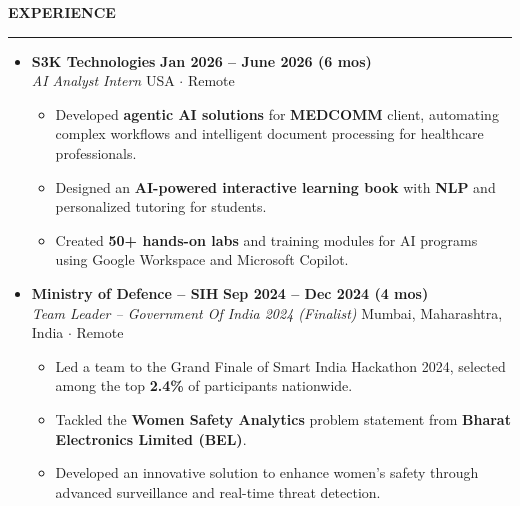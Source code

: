 \documentclass[letterpaper,10pt]{article}
\newcommand{\sectionheader}[1]{%
    \vspace{3pt}
    \noindent\textbf{\large #1}
    \rule{\linewidth}{0.4pt}
    \vspace{-2pt}
}
\begin{document}
\sectionheader{EXPERIENCE}
\begin{itemize}[leftmargin=*,label=\textbullet, noitemsep, topsep=0pt, partopsep=0pt]
    \item \textbf{S3K Technologies} \hfill \textbf{Jan 2026 – June 2026 (6 mos)} \\
    \textit{AI Analyst Intern} \hfill USA $\cdot$ Remote
    \begin{itemize}[leftmargin=0.75cm,label=\textbullet, noitemsep, topsep=0pt, partopsep=0pt]
        \item Developed \textbf{agentic AI solutions} for \textbf{MEDCOMM} client, automating complex workflows and intelligent document processing for healthcare professionals.
        \item Designed an \textbf{AI-powered interactive learning book} with \textbf{NLP} and personalized tutoring for students.
        \item Created \textbf{50+ hands-on labs} and training modules for AI programs using Google Workspace and Microsoft Copilot.
    \end{itemize}

    \vspace{1pt}

    \item \textbf{Ministry of Defence – SIH} \hfill \textbf{Sep 2024 – Dec 2024 (4 mos)} \\
    \textit{Team Leader – Government Of India 2024 (Finalist)} \hfill Mumbai, Maharashtra, India $\cdot$ Remote
    \begin{itemize}[leftmargin=0.75cm,label=\textbullet, noitemsep, topsep=0pt, partopsep=0pt]
        \item Led a team to the Grand Finale of Smart India Hackathon 2024, selected among the top \textbf{2.4\%} of participants nationwide.
        \item Tackled the \textbf{Women Safety Analytics} problem statement from \textbf{Bharat Electronics Limited (BEL)}.
        \item Developed an innovative solution to enhance women's safety through advanced surveillance and real-time threat detection.
    \end{itemize}
\end{itemize}
\end{document}
